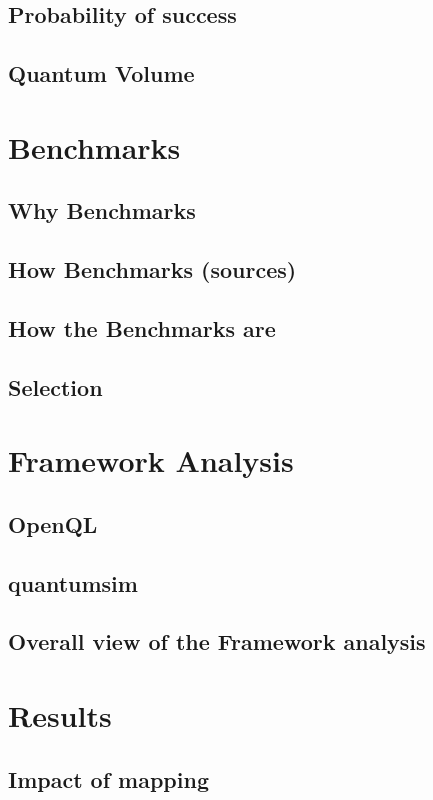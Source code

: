 \documentclass[11pt]{article}
\begin{document}
\subsection{Probability of success}
\label{sec:org9884af3}

\subsection{Quantum Volume}
\label{sec:org516ee7c}
\section{Benchmarks}
\label{sec:orgbf1375d}
\subsection{Why Benchmarks}
\label{sec:orgf4b0049}
\subsection{How Benchmarks (sources)}
\label{sec:org3b51801}
\subsection{How the Benchmarks are}
\label{sec:orgf574c69}
\subsection{Selection}
\label{sec:orgda14697}
\section{Framework Analysis}
\label{sec:orgf7efb16}
\subsection{OpenQL}
\label{sec:org1bb70bc}
\subsection{quantumsim}
\label{sec:org71ad76b}
\subsection{Overall view of the Framework analysis}
\label{sec:org48e2ac6}
\section{Results}
\label{sec:org1c42612}
\subsection{Impact of mapping}
\label{sec:org8bf4a01}
\end{document}
